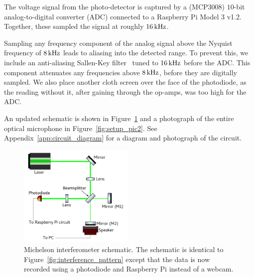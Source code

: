 \documentclass[paper-main.tex]{subfiles}
\begin{document}
The voltage signal from the photo-detector is captured by a (MCP3008) $10$-bit analog-to-digital converter (ADC) connected to a Raspberry Pi Model 3 v1.2. 
Together, these sampled the signal at roughly $16\,{\rm kHz}$.


Sampling any frequency component of the analog signal above the Nyquist frequency of $8\,{\rm kHz}$ leads to aliasing into the detected range. 
To prevent this, we include an anti-aliasing Sallen-Key filter~\cite{sallen_key_filter} tuned to $16\,{\rm kHz}$ before the ADC. 
This component attenuates any frequencies above $8\,{\rm kHz}$, before they are digitally sampled.
We also place another cloth screen over the face of the photodiode, as the reading without it, after gaining through the op-amps, was too high for the ADC.

An updated schematic is shown in Figure~\ref{fig:ifo_schematic_podo} and a photograph of the entire optical microphone in Figure~\ref{fig:setup_pic2}.
See Appendix~\ref{app:circuit_diagram} for a diagram and photograph of the circuit. 


\begin{figure}
	\includegraphics[width=0.49\textwidth]{figures/ifo_schematic_photodiode_edit.pdf}
	\caption{
Michelson interferometer schematic. 
The schematic is identical to Figure~\ref{fig:interference_pattern} except that the data is now recorded using a photodiode and Raspberry Pi instead of a webcam. 
}
	\label{fig:ifo_schematic_podo}
\end{figure}
\end{document}
